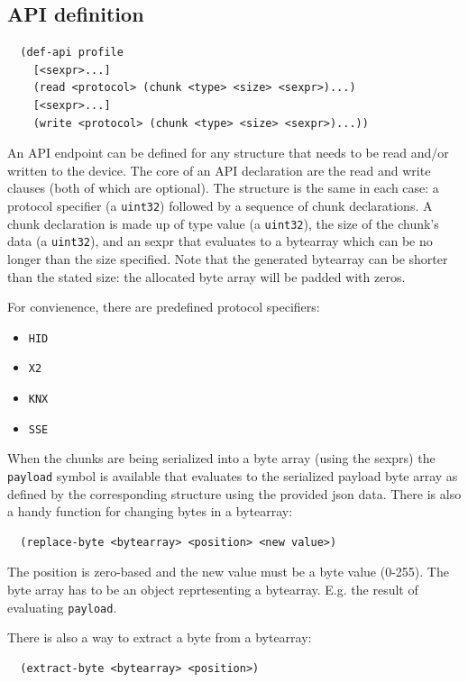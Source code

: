 \documentclass[12pt]{article}
\begin{document}
\subsection{API definition}

\begin{verbatim}
  (def-api profile
    [<sexpr>...]
    (read <protocol> (chunk <type> <size> <sexpr>)...)
    [<sexpr>...]
    (write <protocol> (chunk <type> <size> <sexpr>)...))
\end{verbatim}

\noindent An API endpoint can be defined for any structure that needs
to be read and/or written to the device. The core of an API
declaration are the read and write clauses (both of which are
optional). The structure is the same in each case: a protocol specifier
(a \verb|uint32|) followed by a sequence of chunk declarations. A chunk
declaration is made up of type value (a \verb|uint32|), the size of the chunk's
data (a \verb|uint32|), and an sexpr that evaluates to a bytearray which can be
no longer than the size specified. Note that the generated bytearray
can be shorter than the stated size: the allocated byte array will be
padded with zeros.

For convienence, there are predefined protocol specifiers:

\begin{itemize}
\item \verb|HID|
\item \verb|X2|
\item \verb|KNX|
\item \verb|SSE|
\end{itemize}

When the chunks are being serialized into a byte array (using the
sexprs) the \verb|payload| symbol is available that evaluates to the
serialized payload byte array as defined by the corresponding
structure using the provided json data. There is also a handy function
for changing bytes in a bytearray:

\begin{verbatim}
  (replace-byte <bytearray> <position> <new value>)
\end{verbatim}

The position is zero-based and the new value must be a byte value
(0-255). The byte array has to be an object reprtesenting a bytearray.
E.g. the result of evaluating \verb|payload|.

There is also a way to extract a byte from a bytearray:

\begin{verbatim}
  (extract-byte <bytearray> <position>)
\end{verbatim}
\end{document}
